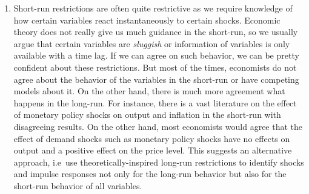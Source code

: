 \begin{enumerate}
\item Short-run restrictions are often quite restrictive as we require knowledge of how certain variables react instantaneously to certain shocks.
Economic theory does not really give us much guidance in the short-run,
  so we usually argue that certain variables are \emph{sluggish}
  or information of variables is only available with a time lag.
If we can agree on such behavior, we can be pretty confident about these restrictions.
But most of the times, economists do not agree about the behavior of the variables in the short-run or have competing models about it.
On the other hand, there is much more agreement what happens in the long-run.
For instance, there is a vast literature on the effect of monetary policy shocks on output and inflation in the short-run with disagreeing results.
On the other hand, most economists would agree that the effect of demand shocks
  such as monetary policy shocks have no effects on output and a positive effect on the price level.
This suggests an alternative approach, i.e\ use theoretically-inspired long-run restrictions to identify shocks and impulse responses
  not only for the long-run behavior but also for the short-run behavior of all variables.


\end{enumerate}
